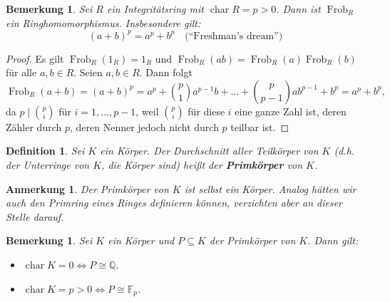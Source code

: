 \documentclass[a4paper, twoside, 11pt, ngerman]{report}
\newcommand{\FF}{\mathds F}
\newcommand{\QQ}{\mathds Q}
\DeclareMathOperator{\charact}{char}
\DeclareMathOperator{\Frob}{Frob}
\theoremstyle{definistyle}
\newtheorem{defini}[satz]{Definition}
\newtheorem{bem}[satz]{Bemerkung}
\newtheorem{anm}[satz]{Anmerkung}
\theoremstyle{remark}
\newcommand{\defn}[1]{\textit{\bfseries #1}}
\begin{document}
\begin{bem}\label{bem:frobenius_ringhom}
Sei $R$ ein Integritätsring mit $\charact R = p > 0$. Dann ist $\Frob_R$ ein Ringhomomorphismus. Insbesondere gilt:
\[
(a + b)^p = a^p + b^p \quad \text{(``Freshman's dream'')}
\]
\end{bem}

\begin{proof}
Es gilt $\Frob_R(1_R) = 1_R$ und $\Frob_R(a b) = \Frob_R(a) \Frob_R(b)$ für alle $a, b \in R$. Seien $a, b \in R$. Dann folgt
\[
\Frob_R(a + b) = (a + b)^p = a^p + \binom{p}{1} a^{p-1} b + \dots + \binom{p}{p-1} a b^{p-1} + b^p = a^p + b^p,
\]
da $p \mid \binom{p}{i}$ für $i = 1, \dots, p - 1$, weil $\binom{p}{i}$ für diese $i$ eine ganze Zahl
ist, deren Zähler durch $p$, deren Nenner jedoch nicht durch $p$ teilbar ist.
\end{proof}

\begin{defini}\label{def:primkoerper}
Sei $K$ ein Körper. Der Durchschnitt aller Teilkörper von $K$ (d.h. der Unterringe von $K$, die Körper sind) heißt der \defn{Primkörper} von $K$.
\end{defini}

\begin{anm}\label{anm:primkoerper_ist_koerper}
Der Primkörper von $K$ ist selbst ein Körper. Analog hätten wir auch den Primring eines Ringes definieren können, verzichten aber an dieser Stelle darauf.
\end{anm}

\begin{bem}\label{bem:charakteristik_und_primkoerper}
Sei $K$ ein Körper und $P \subseteq K$ der Primkörper von $K$. Dann gilt:
\begin{itemize}
    \item[(a)] $\charact K = 0 \iff P \cong \QQ$.
    \item[(b)] $\charact K = p > 0 \iff P \cong \FF_p$.
\end{itemize}
\end{bem}
\end{document}
